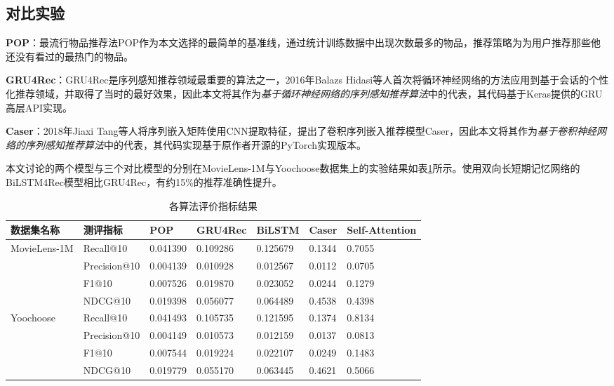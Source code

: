 
\subsection{对比实验}
\textbf{POP}：最流行物品推荐法POP作为本文选择的最简单的基准线，通过统计训练数据中出现次数最多的物品，推荐策略为为用户推荐那些他还没有看过的最热门的物品。

\textbf{GRU4Rec}：GRU4Rec是序列感知推荐领域最重要的算法之一，2016年Balazs Hidasi等人首次将循环神经网络的方法应用到基于会话的个性化推荐领域，并取得了当时的最好效果，因此本文将其作为\textit{基于循环神经网络的序列感知推荐算法}中的代表，其代码基于Keras提供的GRU高层API实现。

\textbf{Caser}：2018年Jiaxi Tang等人将序列嵌入矩阵使用CNN提取特征，提出了卷积序列嵌入推荐模型Caser，因此本文将其作为\textit{基于卷积神经网络的序列感知推荐算法}中的代表，其代码实现基于原作者开源的PyTorch实现版本。

本文讨论的两个模型与三个对比模型的分别在MovieLens-1M与Yoochoose数据集上的实验结果如表\ref{table:result}所示。使用双向长短期记忆网络的BiLSTM4Rec模型相比GRU4Rec，有约15\%的推荐准确性提升。

\begin{table}[]
\centering
\caption{各算法评价指标结果}
\label{table:result}
  \begin{tabular}{@{}lllllll@{}}
  \toprule
  数据集名称                     & 测评指标      & POP      & GRU4Rec  & \textbf{BiLSTM} & Caser & \textbf{Self-Attention} \\ \midrule
  \multirow{4}{*}{MovieLens-1M} & Recall@10    & 0.041390 & 0.109286 & 0.125679 & 0.1344 & 0.7055      \\
                                & Precision@10 & 0.004139 & 0.010928 & 0.012567 & 0.0112 & 0.0705      \\
                                & F1@10        & 0.007526 & 0.019870 & 0.023052 & 0.0244 & 0.1279      \\
                                & NDCG@10      & 0.019398 & 0.056077 & 0.064489 & 0.4538 & 0.4398      \\
  \multirow{4}{*}{Yoochoose}    & Recall@10    & 0.041493 & 0.105735 & 0.121595 & 0.1374 & 0.8134      \\
                                & Precision@10 & 0.004149 & 0.010573 & 0.012159 & 0.0137 & 0.0813      \\
                                & F1@10        & 0.007544 & 0.019224 & 0.022107 & 0.0249 & 0.1483      \\
                                & NDCG@10      & 0.019779 & 0.055170 & 0.063445 & 0.4621 & 0.5066      \\ \cmidrule(l){2-7} 
  \end{tabular}
\end{table}

